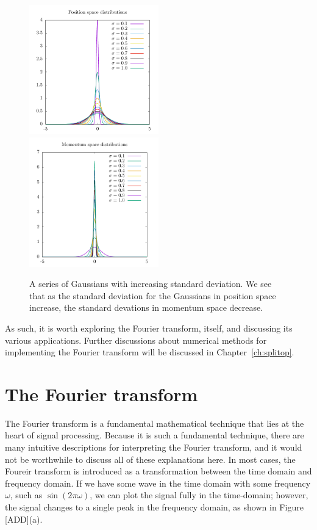\begin{figure}

\includegraphics[width = 0.5\textwidth]{data/qs/Heisenberg/position.pdf}
\includegraphics[width = 0.5\textwidth]{data/qs/Heisenberg/momentum.pdf}

\caption{A series of Gaussians with increasing standard deviation. We see that as the standard deviation for the Gaussians in position space increase, the standard devations in momentum space decrease.}
\label{fig:uncertain}
\end{figure}


As such, it is worth exploring the Fourier transform, itself, and discussing its various applications.
Further discussions about numerical methods for implementing the Fourier transform will be discussed in Chapter~\ref{ch:splitop}.

\section{The Fourier transform}


The Fourier transform is a fundamental mathematical technique that lies at the heart of signal processing.
Because it is such a fundamental technique, there are many intuitive descriptions for interpreting the Fourier transform, and it would not be worthwhile to discuss all of these explanations here.
In most cases, the Foureir transform is introduced as a transformation between the time domain and frequency domain.
If we have some wave in the time domain with some frequency $\omega$, such as $\sin(2\pi\omega)$, we can plot the signal fully in the time-domain; however, the signal changes to a single peak in the frequency domain, as shown in Figure [ADD](a).

